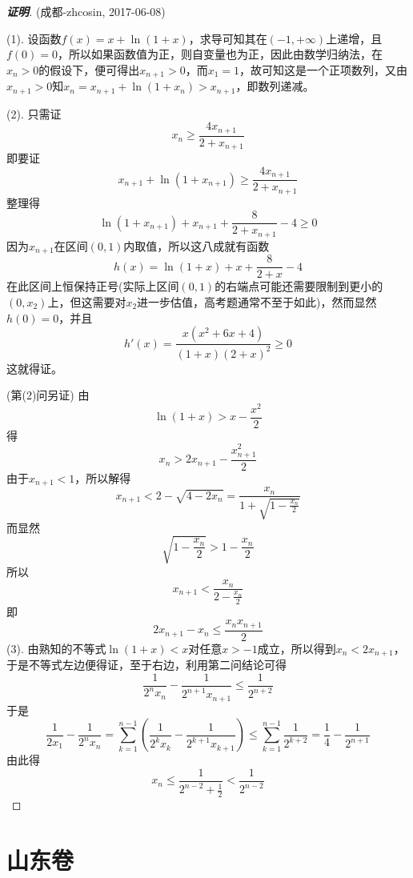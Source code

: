 \documentclass{ctexart}
\begin{document}
\begin{proof}[\textbf{证明}] (成都-zhcosin, 2017-06-08)

  (1). 设函数$f(x)=x+\ln{(1+x)}$，求导可知其在$(-1,+\infty)$上递增，且$f(0)=0$，所以如果函数值为正，则自变量也为正，因此由数学归纳法，在$x_n>0$的假设下，便可得出$x_{n+1}>0$，而$x_1=1$，故可知这是一个正项数列，又由$x_{n+1}>0$知$x_n=x_{n+1}+\ln{(1+x_n)}>x_{n+1}$，即数列递减。

  (2). 只需证
  \[ x_n \geqslant \frac{4x_{n+1}}{2+x_{n+1}} \]
  即要证
  \[ x_{n+1}+\ln{(1+x_{n+1})} \geqslant \frac{4x_{n+1}}{2+x_{n+1}} \]
  整理得
  \[ \ln{(1+x_{n+1})} + x_{n+1} + \frac{8}{2+x_{n+1}} -4 \geqslant 0 \]
  因为$x_{n+1}$在区间$(0,1)$内取值，所以这八成就有函数
  \[ h(x)=\ln{(1+x)}+x+\frac{8}{2+x}-4 \]
  在此区间上恒保持正号(实际上区间$(0,1)$的右端点可能还需要限制到更小的$(0,x_2)$上，但这需要对$x_2$进一步估值，高考题通常不至于如此)，然而显然$h(0)=0$，并且
  \[ h'(x) = \frac{x(x^2+6x+4)}{(1+x)(2+x)^2} \geqslant 0 \]
  这就得证。

  (第(2)问另证)
  由
  \[ \ln{(1+x)} > x-\frac{x^2}{2} \]
  得
  \[ x_n > 2x_{n+1}-\frac{x_{n+1}^2}{2} \]
  由于$x_{n+1}<1$，所以解得
  \[ x_{n+1} < 2-\sqrt{4-2x_n} = \frac{x_n}{1+\sqrt{1-\frac{x_n}{2}}} \]
  而显然
  \[ \sqrt{1-\frac{x_n}{2}} > 1-\frac{x_n}{2} \]
  所以
  \[ x_{n+1} < \frac{x_n}{2-\frac{x_n}{2}} \]
  即
  \[ 2x_{n+1}-x_n \leqslant \frac{x_nx_{n+1}}{2} \]
   (3). 由熟知的不等式$\ln{(1+x)}<x$对任意$x>-1$成立，所以得到$x_n<2x_{n+1}$，于是不等式左边便得证，至于右边，利用第二问结论可得
  \[ \frac{1}{2^nx_n}-\frac{1}{2^{n+1}x_{n+1}} \leqslant \frac{1}{2^{n+2}} \]
  于是
  \[ \frac{1}{2x_1} - \frac{1}{2^nx_n} = \sum_{k=1}^{n-1} \left( \frac{1}{2^kx_k}-\frac{1}{2^{k+1}x_{k+1}} \right) \leqslant \sum_{k=1}^{n-1}\frac{1}{2^{k+2}}=\frac{1}{4}-\frac{1}{2^{n+1}} \]
  由此得
  \[ x_n \leqslant \frac{1}{2^{n-2}+\frac{1}{2}} <\frac{1}{2^{n-2}} \]
\end{proof}

\section{山东卷}
\label{sec:shandong}
\end{document}
